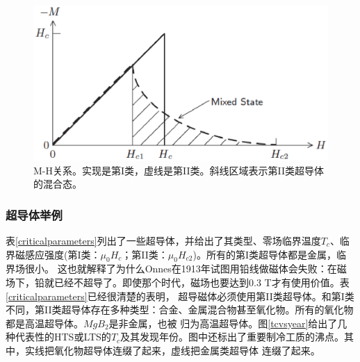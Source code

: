 \begin{figure}[htbp]
  \centering
 \includegraphics[scale=0.6]{chpt1/figs/fig1.3.eps}
  \caption{
M-H关系。实现是第I类，虚线是第II类。斜线区域表示第II类超导体的混合态。
}\label{mhcurve}
\end{figure}

\subsubsection{超导体举例}
表\ref{criticalparameters}列出了一些超导体，并给出了其类型、零场临界温度$T_c$、临界磁感应强度(第I类：$\mu_0H_c$；第II类：$\mu_0H_{c2}$)。所有的第I类超导体都是金属，临界场很小。
这也就解释了为什么Onnes在1913年试图用铅线做磁体会失败：在磁场下，铅就已经不超导了。即使那个时代，磁场也要达到0.3 T才有使用价值。表\ref{criticalparameters}已经很清楚的表明，
超导磁体必须使用第II类超导体。和第I类不同，第II类超导体存在多种类型：合金、金属混合物甚至氧化物。所有的氧化物都是高温超导体。$MgB_2$是非金属，也被
归为高温超导体。图\ref{tcvsyear}给出了几种代表性的HTS或LTS的$T_c$及其发现年份。图中还标出了重要制冷工质的沸点。其中，实线把氧化物超导体连缀了起来，虚线把金属类超导体
连缀了起来。

